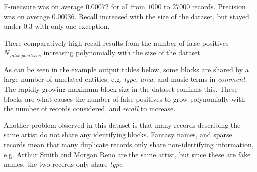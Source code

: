 \documentclass[a4paper,12pt]{article}
\begin{document}
F-measure was on average $0.00072$ for all from $1000$ to $27000$ records. Precision was on average $0.00036$. Recall increased with the size of the dataset, but stayed under $0.3$ with only one exception.

\begin{center}
\end{center}

There comparatively high recall results from the number of false positives $N_{false\ positives}$ increasing polynomially with the size of the dataset.

\begin{center}
\end{center}

As can be seen in the example output tables below, some blocks are shared by a large number of unrelated entities, e.g. \emph{type, area}, and music terms in \emph{comment}. The rapidly growing maximum block size in the dataset confirms this. These blocks are what causes the number of false positives to grow polynomially with the number of records considered, and \emph{recall} to increase.

Another problem observed in this dataset is that many records describing the same artist do not share any identifying blocks. Fantasy names, and sparse records mean that many duplicate records only share non-identifying information, e.g. Arthur Smith and Morgan Reno are the same artist, but since these are fake names, the two records only share \emph{type}.
\end{document}
